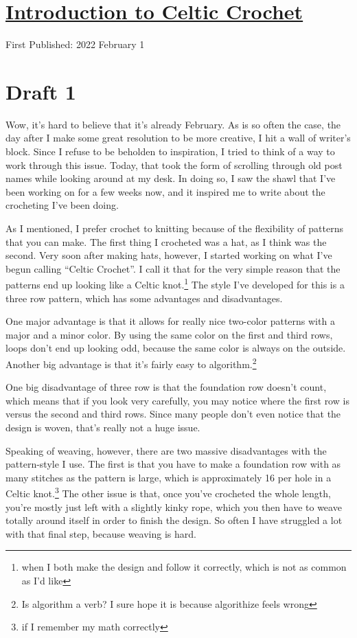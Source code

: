 \documentclass[12pt]{article}[titlepage]
\newcommand{\say}[1]{``#1''}
\renewcommand{\,}{\textsuperscript{,}}
\begin{document}
\doublespacing
\section{\href{celtic-crochet.html}{Introduction to Celtic Crochet}}
First Published: 2022 February 1

\section{Draft 1}
Wow, it's hard to believe that it's already February.
As is so often the case, the day after I make some great resolution to be more creative, I hit a wall of writer's block.
Since I refuse to be beholden to inspiration, I tried to think of a way to work through this issue.
Today, that took the form of scrolling through old post names while looking around at my desk.
In doing so, I saw the shawl that I've been working on for a few weeks now, and it inspired me to write about the crocheting I've been doing.

As I mentioned, I prefer crochet to knitting because of the flexibility of patterns that you can make.
The first thing I crocheted was a hat, as I think was the second.
Very soon after making hats, however, I started working on what I've begun calling \say{Celtic Crochet}.
I call it that for the very simple reason that the patterns end up looking like a Celtic knot.\footnote{when I both make the design and follow it correctly, which is not as common as I'd like}
The style I've developed for this is a three row pattern, which has some advantages and disadvantages.

One major advantage is that it allows for really nice two-color patterns with a major and a minor color.
By using the same color on the first and third rows, loops don't end up looking odd, because the same color is always on the outside.
Another big advantage is that it's fairly easy to algorithm.\footnote{Is algorithm a verb? I sure hope it is because algorithize feels wrong}

One big disadvantage of three row is that the foundation row doesn't count, which means that if you look very carefully, you may notice where the first row is versus the second and third rows.
Since many people don't even notice that the design is woven, that's really not a huge issue.

Speaking of weaving, however, there are two massive disadvantages with the pattern-style I use.
The first is that you have to make a foundation row with as many stitches as the pattern is large, which is approximately 16 per hole in a Celtic knot.\footnote{if I remember my math correctly}
The other issue is that, once you've crocheted the whole length, you're mostly just left with a slightly kinky rope, which you then have to weave totally around itself in order to finish the design.
So often I have struggled a lot with that final step, because weaving is hard.
\end{document}
